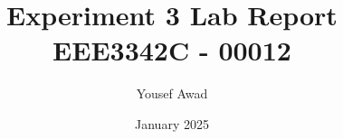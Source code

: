 

\documentclass{article}
\usepackage{graphicx} %
\usepackage{varwidth}
\usepackage{karnaugh-map}
\usepackage{subfig}
\usepackage{xcolor}
\usepackage{listings}

\captionsetup[lstlisting]{labelformat=empty} %

\title{Experiment 3 Lab Report \\ \large EEE3342C - 00012}
\author{Yousef Awad}
\date{January 2025}
\setcounter{secnumdepth}{0}



\maketitle
\tableofcontents
\newpage

\section{Equipment}
For this experiment a Windows 11 computer was used alongside the Xilinx Vivado 2024.2 software, alongside an FPGA board, the BASYS 3 development board. The board specifically only used to ensure the simulation by the Vivado software was accurate in the real world, as well as to verify the simulation software wasn't incorrect.\\


